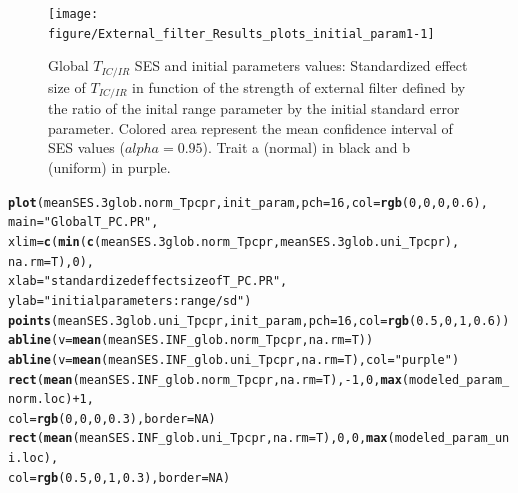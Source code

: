 \documentclass[12pt]{article}\usepackage[]{graphicx}\usepackage[]{color}
\makeatletter
\newcommand{\hlnum}[1]{\textcolor[rgb]{0.686,0.059,0.569}{#1}}%
\newcommand{\hlstr}[1]{\textcolor[rgb]{0.192,0.494,0.8}{#1}}%
\newcommand{\hlopt}[1]{\textcolor[rgb]{0,0,0}{#1}}%
\newcommand{\hlstd}[1]{\textcolor[rgb]{0.345,0.345,0.345}{#1}}%
\newcommand{\hlkwc}[1]{\textcolor[rgb]{0.333,0.667,0.333}{#1}}%
\newcommand{\hlkwd}[1]{\textcolor[rgb]{0.737,0.353,0.396}{\textbf{#1}}}%
\newenvironment{kframe}{%
 \def\at@end@of@kframe{}%
 \ifinner\ifhmode%
  \def\at@end@of@kframe{\end{minipage}}%
  \begin{minipage}{\columnwidth}%
 \fi\fi%
 \def\FrameCommand##1{\hskip\@totalleftmargin \hskip-\fboxsep
 \colorbox{shadecolor}{##1}\hskip-\fboxsep
     \hskip-\linewidth \hskip-\@totalleftmargin \hskip\columnwidth}%
 \MakeFramed {\advance\hsize-\width
   \@totalleftmargin\z@ \linewidth\hsize
   \@setminipage}}%
 {\par\unskip\endMakeFramed%
 \at@end@of@kframe}
\newenvironment{knitrout}{}{} %
\makeatother
\begin{document}
\begin{knitrout}
\begin{figure}
{\centering \texttt{[image: figure/External\_filter\_Results\_plots\_initial\_param1-1]} 

}

\caption[Global $T_{IC/IR}$ SES and initial parameters values]{Global $T_{IC/IR}$ SES and initial parameters values: Standardized effect size of $T_{IC/IR}$ in function of the strength of external filter defined by the ratio of the inital range parameter by the initial standard error parameter. Colored area represent the mean confidence interval of SES values ($alpha = 0.95$). Trait a (normal) in black and b (uniform) in purple.\label{fig:External_filter_Results_plots_initial_param1}}
\end{figure}


\end{knitrout}

\begin{knitrout}\small
{}\color{fgcolor}\begin{kframe}
\begin{alltt}
\hlkwd{plot}\hlstd{(meanSES.3glob.norm_Tpcpr, init_param,} \hlkwc{pch} \hlstd{=} \hlnum{16}\hlstd{,} \hlkwc{col} \hlstd{=} \hlkwd{rgb}\hlstd{(}\hlnum{0}\hlstd{,} \hlnum{0}\hlstd{,} \hlnum{0}\hlstd{,} \hlnum{0.6}\hlstd{),}
     \hlkwc{main} \hlstd{=} \hlstr{"Global T_PC.PR"}\hlstd{,}
     \hlkwc{xlim} \hlstd{=} \hlkwd{c}\hlstd{(}\hlkwd{min}\hlstd{(}\hlkwd{c}\hlstd{(meanSES.3glob.norm_Tpcpr, meanSES.3glob.uni_Tpcpr),}
            \hlkwc{na.rm} \hlstd{= T),} \hlnum{0}\hlstd{),}
     \hlkwc{xlab} \hlstd{=} \hlstr{"standardized effect size of T_PC.PR"}\hlstd{,}
     \hlkwc{ylab} \hlstd{=} \hlstr{"initial parameters: range/sd"}\hlstd{)}
\hlkwd{points}\hlstd{(meanSES.3glob.uni_Tpcpr, init_param,} \hlkwc{pch} \hlstd{=} \hlnum{16}\hlstd{,} \hlkwc{col} \hlstd{=} \hlkwd{rgb}\hlstd{(}\hlnum{0.5}\hlstd{,} \hlnum{0}\hlstd{,} \hlnum{1}\hlstd{,} \hlnum{0.6}\hlstd{))}
\hlkwd{abline}\hlstd{(}\hlkwc{v} \hlstd{=} \hlkwd{mean}\hlstd{(meanSES.INF_glob.norm_Tpcpr,} \hlkwc{na.rm} \hlstd{= T))}
\hlkwd{abline}\hlstd{(}\hlkwc{v} \hlstd{=} \hlkwd{mean}\hlstd{(meanSES.INF_glob.uni_Tpcpr,} \hlkwc{na.rm} \hlstd{= T),} \hlkwc{col} \hlstd{=} \hlstr{"purple"}\hlstd{)}
\hlkwd{rect}\hlstd{(}\hlkwd{mean}\hlstd{(meanSES.INF_glob.norm_Tpcpr,} \hlkwc{na.rm} \hlstd{= T),} \hlopt{-}\hlnum{1}\hlstd{,} \hlnum{0}\hlstd{,} \hlkwd{max}\hlstd{(modeled_param_norm.loc)} \hlopt{+} \hlnum{1}\hlstd{,}
     \hlkwc{col} \hlstd{=} \hlkwd{rgb}\hlstd{(}\hlnum{0}\hlstd{,} \hlnum{0}\hlstd{,} \hlnum{0}\hlstd{,} \hlnum{0.3}\hlstd{),} \hlkwc{border} \hlstd{=} \hlnum{NA}\hlstd{)}
\hlkwd{rect}\hlstd{(}\hlkwd{mean}\hlstd{(meanSES.INF_glob.uni_Tpcpr,} \hlkwc{na.rm} \hlstd{= T),} \hlnum{0}\hlstd{,} \hlnum{0}\hlstd{,} \hlkwd{max}\hlstd{(modeled_param_uni.loc),}
     \hlkwc{col} \hlstd{=} \hlkwd{rgb}\hlstd{(}\hlnum{0.5}\hlstd{,} \hlnum{0}\hlstd{,} \hlnum{1}\hlstd{,} \hlnum{0.3}\hlstd{),} \hlkwc{border} \hlstd{=} \hlnum{NA}\hlstd{)}
\end{alltt}
\end{kframe}\begin{figure}


\end{figure}
\end{knitrout}
\end{document}
